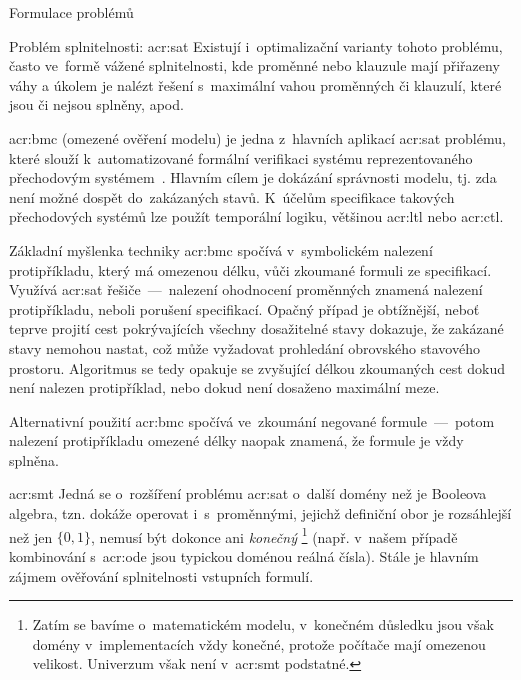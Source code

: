 \documentclass[thesis=M,czech]{FITthesis}[2012/06/26]
\newcommand{\acrlabel}[1]{acr:#1}
\newcommand{\acr}[1]{\acrshort{\acrlabel{#1}}}
\newcommand{\acrf}[1]{\acrfull{\acrlabel{#1}}}
\newcommand{\hl}[1]{\textit{#1}}
\newcommand{\cit}[1]{\cite{#1}}
\begin{document}
\begin{section}{Formulace problémů}
\begin{subsection}{Problém splnitelnosti: \acr{sat}}
Existují i~optimalizační varianty tohoto problému,
často ve~formě vážené splnitelnosti,
kde proměnné nebo klauzule mají přiřazeny váhy
a úkolem je nalézt řešení s~maximální vahou
proměnných či klauzulí, které jsou či nejsou splněny, apod.


\begin{paragraph}{\acrf{bmc}}\label{p:theory:formulation:sat:bmc}
(omezené ověření modelu)
je jedna z~hlavních aplikací \acr{sat} problému,
které slouží k~automatizované formální verifikaci
systému reprezentovaného přechodovým systémem~\cit{bmc-art}.
Hlavním cílem je dokázání správnosti modelu,
tj. zda není možné dospět do~zakázaných stavů.
K~účelům specifikace takových přechodových systémů
lze použít temporální logiku,
většinou \acr{ltl} nebo \acr{ctl}.

Základní myšlenka techniky \acr{bmc} spočívá
v~symbolickém nalezení protipříkladu,
který má omezenou délku, vůči zkoumané formuli ze specifikací.
Využívá \acr{sat} řešiče~---~nalezení
ohodnocení proměnných znamená nalezení protipříkladu,
neboli porušení specifikací.
Opačný případ je obtížnější,
neboť teprve projití cest pokrývajících všechny dosažitelné stavy
dokazuje, že zakázané stavy nemohou nastat,
což může vyžadovat prohledání obrovského stavového prostoru.
Algoritmus se tedy opakuje se zvyšující délkou zkoumaných cest
dokud není nalezen protipříklad,
nebo dokud není dosaženo maximální meze.

Alternativní použití \acr{bmc} spočívá ve~zkoumání
negované formule~---~potom nalezení protipříkladu
omezené délky naopak znamená,
že formule je vždy splněna.
\end{paragraph} %


\end{subsection} %


\begin{subsection}{\acrf{smt}}\label{ss:theory:formulation:smt}
Jedná se o~rozšíření problému \acr{sat}
o~další domény než je Booleova algebra,
tzn. dokáže operovat i~s~proměnnými,
jejichž definiční obor je rozsáhlejší než jen
${\{0,1\}}$, nemusí být dokonce ani \hl{konečný}%
\footnote{Zatím se bavíme o~matematickém modelu,
v~konečném důsledku jsou však domény v~implementacích
vždy konečné, protože počítače mají omezenou velikost.
Univerzum však není v~\acr{smt} podstatné.}
(např. v~našem případě kombinování s~\acr{ode}
jsou typickou doménou reálná čísla).
Stále je hlavním zájmem ověřování
splnitelnosti vstupních formulí.


\end{subsection}
\end{section}
\end{document}

